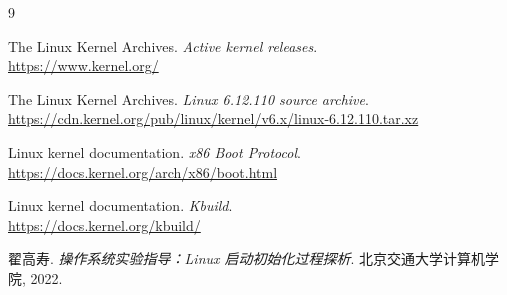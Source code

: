 \documentclass[UTF8,zihao=-4,openany,fontset=none]{ctexrep}
\begin{document}
\endgroup
\begin{thebibliography}{9}
  The Linux Kernel Archives. \emph{Active kernel releases}.\\
  \url{https://www.kernel.org/}

  The Linux Kernel Archives. \emph{Linux 6.12.110 source archive}.\\
  \url{https://cdn.kernel.org/pub/linux/kernel/v6.x/linux-6.12.110.tar.xz}

  Linux kernel documentation. \emph{x86 Boot Protocol}.\\
  \url{https://docs.kernel.org/arch/x86/boot.html}

  Linux kernel documentation. \emph{Kbuild}.\\
  \url{https://docs.kernel.org/kbuild/}

  翟高寿. \emph{操作系统实验指导：Linux 启动初始化过程探析}. 北京交通大学计算机学院, 2022.
\end{thebibliography}
\end{document}
